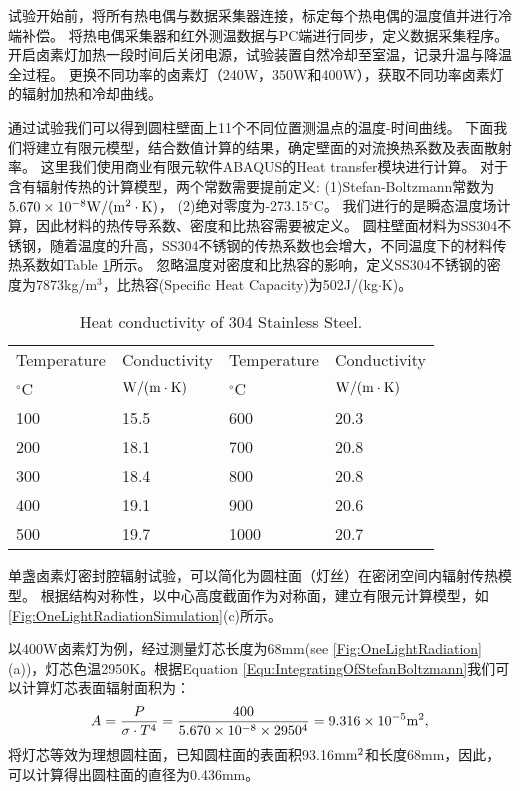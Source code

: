 试验开始前，将所有热电偶与数据采集器连接，标定每个热电偶的温度值并进行冷端补偿。
将热电偶采集器和红外测温数据与PC端进行同步，定义数据采集程序。
开启卤素灯加热一段时间后关闭电源，试验装置自然冷却至室温，记录升温与降温全过程。
更换不同功率的卤素灯（240W，350W和400W），获取不同功率卤素灯的辐射加热和冷却曲线。

通过试验我们可以得到圆柱壁面上11个不同位置测温点的温度-时间曲线。
下面我们将建立有限元模型，结合数值计算的结果，确定壁面的对流换热系数及表面散射率。
这里我们使用商业有限元软件ABAQUS的Heat transfer模块进行计算。
对于含有辐射传热的计算模型，两个常数需要提前定义:
(1)Stefan-Boltzmann常数为$5.670\times10^{-8}\rm{W}/(\rm{m}^{2}\cdot \rm{K})$，
(2)绝对零度为-273.15$^{\circ}$C。
我们进行的是瞬态温度场计算，因此材料的热传导系数、密度和比热容需要被定义。
圆柱壁面材料为SS304不锈钢，随着温度的升高，SS304不锈钢的传热系数也会增大，不同温度下的材料传热系数如Table \ref{Tab:SS304HeatTransfer}所示。
忽略温度对密度和比热容的影响，定义SS304不锈钢的密度为7873kg/m$^3$，比热容(Specific Heat Capacity)为502J/(kg$\cdot$K)。

\begin{table}[htbp]
  \centering
  \caption{Heat conductivity of 304 Stainless Steel.}
    \begin{tabular}{llll}
    \toprule
    Temperature & Conductivity & Temperature & Conductivity \\
    $^{\circ}$C & ${\rm{W/(m}} \cdot {\rm{K)}}$ & $^{\circ}$C & ${\rm{W/(m}} \cdot {\rm{K)}}$ \\
    \midrule
    100   & 15.5  & 600   & 20.3 \\
    200   & 18.1  & 700   & 20.8 \\
    300   & 18.4  & 800   & 20.8 \\
    400   & 19.1  & 900   & 20.6 \\
    500   & 19.7  & 1000  & 20.7 \\
    \bottomrule
    \end{tabular}%
  \label{Tab:SS304HeatTransfer}%
\end{table}%


单盏卤素灯密封腔辐射试验，可以简化为圆柱面（灯丝）在密闭空间内辐射传热模型。
根据结构对称性，以中心高度截面作为对称面，建立有限元计算模型，如\ref{Fig:OneLightRadiationSimulation}(c)所示。

以400W卤素灯为例，经过测量灯芯长度为68mm(see \ref{Fig:OneLightRadiation}(a))，灯芯色温2950K。根据Equation \ref{Equ:IntegratingOfStefanBoltzmann}我们可以计算灯芯表面辐射面积为：
\begin{equation}
A = \frac{P}{\sigma \cdot T^4} = \frac{400}{5.670\times10^{-8}\times2950^4}=9.316\times10^{-5} {\rm{m}}^2,
\end{equation}
将灯芯等效为理想圆柱面，已知圆柱面的表面积93.16${\rm{mm}}^2$和长度68mm，因此，可以计算得出圆柱面的直径为0.436mm。

